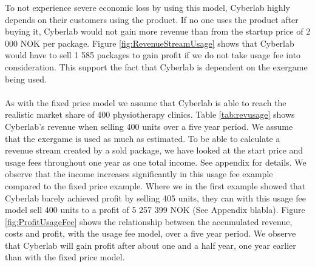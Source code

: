 To not experience severe economic loss by using this model, Cyberlab highly depends on their customers using the product. If no one uses the product after buying it, Cyberlab would not gain more revenue than from the startup price of 2 000 NOK per package. Figure \ref{fig:RevenueStreamUsage} shows that Cyberlab would have to sell 1 585 packages to gain profit if we do not take usage fee into consideration. This support the fact that Cyberlab is dependent on the exergame being used. \\ \\
As with the fixed price model we assume that Cyberlab is able to reach the realistic market share of 400 physiotherapy clinics. Table \ref{tab:revusage} shows Cyberlab's revenue when selling 400 units over a five year period. We assume that the exergame is used as much as estimated. To be able to calculate a revenue stream created by a sold package, we have looked at the start price and usage fees throughout one year as one total income. See appendix for details. We observe that the income increases significantly in this usage fee example compared to the fixed price example. Where we in the first example showed that Cyberlab barely achieved profit by selling 405 units, they can with this usage fee model sell 400 units to a profit of 5 257 399 NOK (See Appendix blabla). Figure \ref{fig:ProfitUsageFee} shows the relationship between the accumulated revenue, costs and profit, with the usage fee model, over a five year period. We observe that Cyberlab will gain profit after about one and a half year, one year earlier than with the fixed price model. \\ \\

